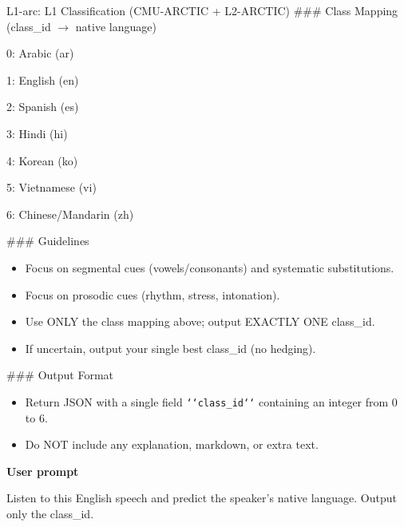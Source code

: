 {\begin{promptbox}{L1-arc: L1 Classification (CMU-ARCTIC + L2-ARCTIC)}
\noindent\#\#\# Class Mapping (class\_id \(\rightarrow\) native language)
\par
\hspace*{1em}0: Arabic (ar)\par
\hspace*{1em}1: English (en)\par
\hspace*{1em}2: Spanish (es)\par
\hspace*{1em}3: Hindi (hi)\par
\hspace*{1em}4: Korean (ko)\par
\hspace*{1em}5: Vietnamese (vi)\par
\hspace*{1em}6: Chinese/Mandarin (zh)
\par\vspace{2pt}

\noindent\#\#\# Guidelines
\par
\begin{itemize}[leftmargin=*,noitemsep,topsep=2pt]
  \item Focus on segmental cues (vowels/consonants) and systematic substitutions.
  \item Focus on prosodic cues (rhythm, stress, intonation).
  \item Use ONLY the class mapping above; output EXACTLY ONE class\_id.
  \item If uncertain, output your single best class\_id (no hedging).
\end{itemize}

\noindent\#\#\# Output Format
\par
\begin{itemize}[leftmargin=*,noitemsep,topsep=2pt]
  \item Return JSON with a single field \texttt{\string`\string`class\_id\string`\string`} containing an integer from 0 to 6.
  \item Do NOT include any explanation, markdown, or extra text.
\end{itemize}

\par\vspace{2pt}
\textbf{User prompt}\par\vspace{2pt}
\noindent
Listen to this English speech and predict the speaker's native language. Output only the class\_id.
\end{promptbox}

}
